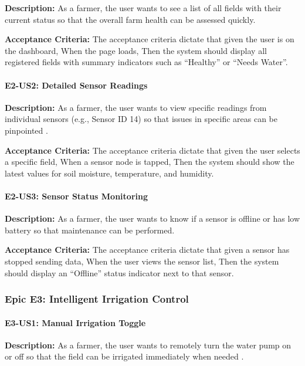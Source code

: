 \textbf{Description:} As a farmer, the user wants to see a list of 
all fields with their current status so that the overall farm health 
can be assessed quickly.

\textbf{Acceptance Criteria:} The acceptance criteria dictate that given the user is on the dashboard, When the page loads, Then the system should display all registered fields with summary indicators such as ``Healthy'' or ``Needs Water''.


\paragraph{E2-US2: Detailed Sensor Readings}

\textbf{Description:} As a farmer, the user wants to view specific 
readings from individual sensors (e.g., Sensor ID 14) so that issues 
in specific areas can be pinpointed \cite{ncbi2023iot}.

\textbf{Acceptance Criteria:} The acceptance criteria dictate that given the user selects a specific field, When a sensor node is tapped, Then the system should show the latest values for soil moisture, temperature, and humidity.


\paragraph{E2-US3: Sensor Status Monitoring}

\textbf{Description:} As a farmer, the user wants to know if a 
sensor is offline or has low battery so that maintenance can be 
performed.

\textbf{Acceptance Criteria:} The acceptance criteria dictate that given a sensor has stopped sending data, When the user views the sensor list, Then the system should display an ``Offline'' status indicator next to that sensor.


\subsubsection{Epic E3: Intelligent Irrigation Control}

\paragraph{E3-US1: Manual Irrigation Toggle}

\textbf{Description:} As a farmer, the user wants to remotely turn 
the water pump on or off so that the field can be irrigated 
immediately when needed \cite{iotsmartag2024}.

